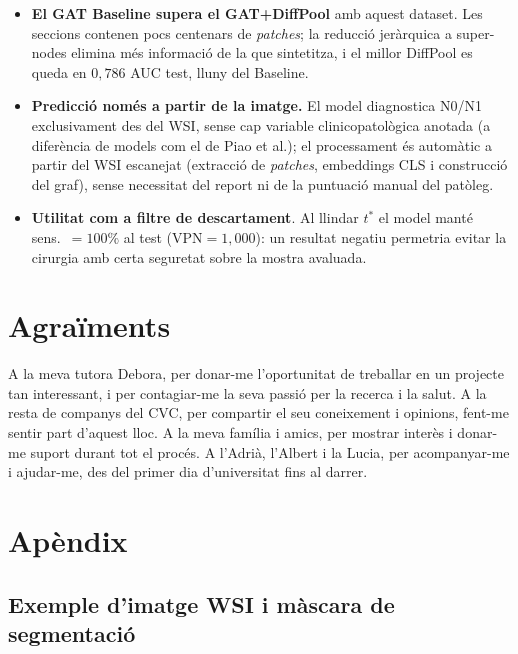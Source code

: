 \documentclass[10pt,a4paper,twocolumn,twoside]{article}
\begin{document}
\begin{itemize}
  \item \textbf{El GAT Baseline supera el GAT+DiffPool} amb aquest dataset. Les seccions
  contenen pocs centenars de \textit{patches}; la reducció jeràrquica a super-nodes
  elimina més informació de la que sintetitza, i el millor DiffPool es queda en
  $0{,}786$ AUC test, lluny del Baseline.
  \item \textbf{Predicció només a partir de la imatge.} El model diagnostica N0/N1
  exclusivament des del WSI, sense cap variable clinicopatològica anotada (a diferència de
  models com el de Piao et al.); el processament és automàtic a partir del WSI escanejat
  (extracció de \textit{patches}, embeddings CLS i construcció del graf), sense necessitat
  del report ni de la puntuació manual del patòleg.
  \item \textbf{Utilitat com a filtre de descartament}. Al llindar $t^*$ el model manté
  sens.\ $=100\%$ al test ($\text{VPN}\!=\!1{,}000$): un resultat negatiu permetria evitar
  la cirurgia amb certa seguretat sobre la mostra avaluada.
\end{itemize}


\section{Agraïments}

A la meva tutora Debora, per donar-me l'oportunitat de treballar en un projecte
tan interessant, i per contagiar-me la seva passió per la recerca i la salut.
A la resta de companys del CVC, per compartir el seu coneixement i opinions,
fent-me sentir part d'aquest lloc.
A la meva família i amics, per mostrar interès i donar-me suport durant tot el procés.
A l'Adrià, l'Albert i la Lucia, per acompanyar-me i ajudar-me,
des del primer dia d'universitat fins al darrer.


\printbibliography

\clearpage
\onecolumn
\raggedbottom
\appendix

\section*{Apèndix}

\setcounter{section}{1}

\subsection{Exemple d'imatge WSI i màscara de segmentació}
\label{app:mask}
\end{document}

